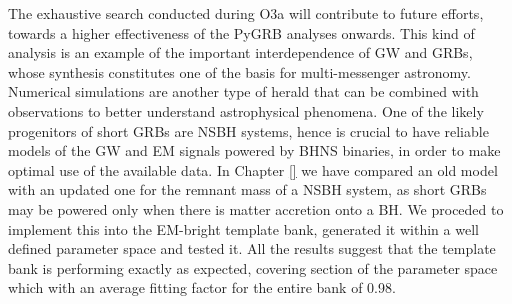 \documentclass[binding=0.6cm, LaM]{sapthesis}
\begin{document}
	The exhaustive search conducted during O3a will contribute to future  efforts,
	towards a higher effectiveness of the {\ttfamily PyGRB} analyses onwards.
	This kind of analysis is an example of the important interdependence of GW and GRBs,
	whose synthesis constitutes one of the basis for multi-messenger astronomy.
	Numerical simulations are another type of herald that can be combined with observations 
	to better understand astrophysical phenomena.
	One of the likely progenitors of short GRBs are NSBH systems, 
	hence is crucial to have reliable models of the GW and EM signals powered by BHNS binaries,
	in order  to  make optimal use of the available data.
	In Chapter \ref{} we have compared an old model \cite{}  with an updated one \cite{} for the remnant mass of a NSBH system,
	as short GRBs may be powered only when there is matter accretion onto a BH.
	We proceded to implement this into the EM-bright template bank,
	generated  it within a well defined parameter space and tested it.
	All the results suggest that the template bank is performing exactly as expected,
	covering section of the parameter space which 
	with an average fitting factor for the entire bank of 0.98.


\backmatter
\cleardoublepage

\end{document}
